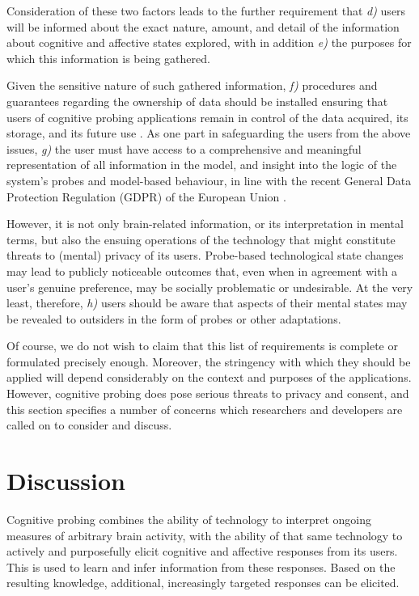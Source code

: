 Consideration of these two factors leads to the further requirement that \emph{d)} users will be informed about the exact nature, amount, and detail of the information about cognitive and affective states explored, with in addition \emph{e)} the purposes for which this information is being gathered. 

Given the sensitive nature of such gathered information, \emph{f)} procedures and guarantees regarding the ownership of data should be installed ensuring that users of cognitive probing applications remain in control of the data acquired, its storage, and its future use \cite{fairclough2014confidential,yuste2017ethical}. As one part in safeguarding the users from the above issues, \emph{g)} the user must have access to a comprehensive and meaningful representation of all information in the model, and insight into the logic of the system's probes and model-based behaviour, in line with the recent General Data Protection Regulation (GDPR) of the European Union \cite{eu2016gdpr}.

However, it is not only brain-related information, or its interpretation in mental terms, but also the ensuing operations of the technology that might constitute threats to (mental) privacy of its users. Probe-based technological state changes may lead to publicly noticeable outcomes that, even when in agreement with a user's genuine preference, may be socially problematic or undesirable. At the very least, therefore, \emph{h)} users should be aware that aspects of their mental states may be revealed to outsiders in the form of probes or other adaptations.

Of course, we do not wish to claim that this list of requirements is complete or formulated precisely enough. Moreover, the stringency with which they should be applied will depend considerably on the context and purposes of the applications. However, cognitive probing does pose serious threats to privacy and consent, and this section specifies a number of concerns which researchers and developers are called on to consider and discuss.


\section{Discussion}
\label{sec:discussion}

Cognitive probing combines the ability of technology to interpret ongoing measures of arbitrary brain activity, with the ability of that same technology to actively and purposefully elicit cognitive and affective responses from its users. This is used to learn and infer information from these responses. Based on the resulting knowledge, additional, increasingly targeted responses can be elicited.

